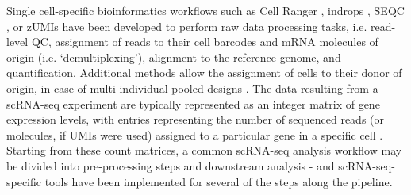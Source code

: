 \clearpage

Single cell-specific bioinformatics workflows such as Cell Ranger \cite{zheng2017massively}, indrops \cite{klein2015droplet}, SEQC  \cite{azizi2018single}, or zUMIs \cite{parekh2018zumis} have been developed to perform raw data processing tasks, i.e. read-level QC, assignment of reads to their cell barcodes and mRNA molecules of origin (i.e. `demultiplexing'), alignment to the reference genome, and quantification. 
Additional methods allow the assignment of cells to their donor of origin, in case of  multi-individual pooled designs \cite{kang2018multiplexed, mccarthy2020cardelino}.
The data resulting from a scRNA-seq experiment are typically represented as an integer matrix of gene expression levels, with entries representing the number of sequenced reads (or molecules, if UMIs were used) assigned to a particular gene in a specific cell \cite{griffiths2018using}.
Starting from these count matrices, a common scRNA-seq analysis workflow may be divided into pre-processing steps and downstream analysis \cite{luecken2019current} - and scRNA-seq-specific tools have been implemented for several of the steps along the pipeline.\\

